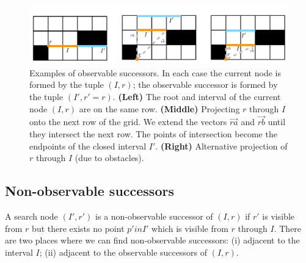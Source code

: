 \begin{figure}[tb]
\center
		   \includegraphics[width=\columnwidth]
			{images/observable.pdf}
	\vspace{-3pt}
\caption{\small
Examples of observable successors. In each case the current node is formed by the tuple $(I, r)$; the observable
successor is formed by the tuple $(I', r' = r)$. \textbf{(Left)} The root and interval of the current node $(I, r)$ are on
the same row. \textbf{(Middle)} Projecting $r$ through $I$ onto the next row of the grid. We extend the vectors $\vec{ra}$ and $\vec{rb}$
until they intersect the next row. The points of intersection become the endpoints of the closed interval $I'$. 
\textbf{(Right)} Alternative projection of $r$ through $I$ (due to obstacles).
}
\label{fig::observable}
\end{figure}

\subsection{Non-observable successors}
A search node $(I', r')$ is a non-observable successor of $(I, r)$ if $r'$ is visible from $r$ but
there exists no point $p' in I'$ which is visible from $r$ through $I$. There are two places
where we can find non-observable successors: (i) adjacent to the interval $I$; (ii) adjacent to the 
observable successors of $(I, r)$.

